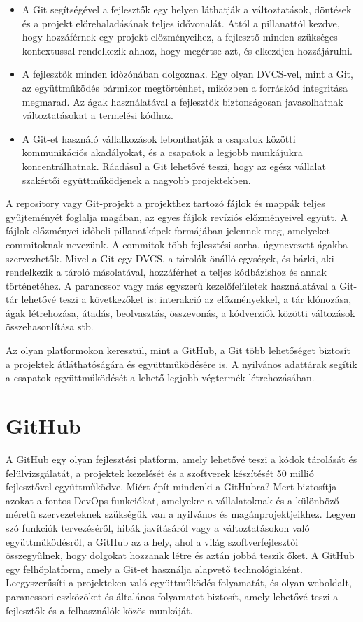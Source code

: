\begin{itemize}
  \item A Git segítségével a fejlesztők egy helyen láthatják a változtatások, döntések és a projekt előrehaladásának teljes idővonalát. Attól a pillanattól kezdve, hogy hozzáférnek egy projekt előzményeihez, a fejlesztő minden szükséges kontextussal rendelkezik ahhoz, hogy megértse azt, és elkezdjen hozzájárulni.
  \item A fejlesztők minden időzónában dolgoznak. Egy olyan DVCS-vel, mint a Git, az együttműködés bármikor megtörténhet, miközben a forráskód integritása megmarad. Az ágak használatával a fejlesztők biztonságosan javasolhatnak változtatásokat a termelési kódhoz.
  \item A Git-et használó vállalkozások lebonthatják a csapatok közötti kommunikációs akadályokat, és a csapatok a legjobb munkájukra koncentrálhatnak. Ráadásul a Git lehetővé teszi, hogy az egész vállalat szakértői együttműködjenek a nagyobb projektekben.
\end{itemize}

A repository vagy Git-projekt a projekthez tartozó fájlok és mappák teljes gyűjteményét foglalja magában, az egyes fájlok revíziós előzményeivel együtt. A fájlok előzményei időbeli pillanatképek formájában jelennek meg, amelyeket commitoknak nevezünk. A commitok több fejlesztési sorba, úgynevezett ágakba szervezhetők. Mivel a Git egy DVCS, a tárolók önálló egységek, és bárki, aki rendelkezik a tároló másolatával, hozzáférhet a teljes kódbázishoz és annak történetéhez. A parancssor vagy más egyszerű kezelőfelületek használatával a Git-tár lehetővé teszi a következőket is: interakció az előzményekkel, a tár klónozása, ágak létrehozása, átadás, beolvasztás, összevonás, a kódverziók közötti változások összehasonlítása stb.

Az olyan platformokon keresztül, mint a GitHub, a Git több lehetőséget biztosít a projektek átláthatóságára és együttműködésére is. A nyilvános adattárak segítik a csapatok együttműködését a lehető legjobb végtermék létrehozásában.
\cite{git}

\section{GitHub}
A GitHub egy olyan fejlesztési platform, amely lehetővé teszi a kódok tárolását és felülvizsgálatát, a projektek kezelését és a szoftverek készítését 50 millió fejlesztővel együttműködve. Miért épít mindenki a GitHubra? Mert biztosítja azokat a fontos DevOps funkciókat, amelyekre a vállalatoknak és a különböző méretű szervezeteknek szükségük van a nyilvános és magánprojektjeikhez. Legyen szó funkciók tervezéséről, hibák javításáról vagy a változtatásokon való együttműködésről, a GitHub az a hely, ahol a világ szoftverfejlesztői összegyűlnek, hogy dolgokat hozzanak létre és aztán jobbá teszik őket. A GitHub egy felhőplatform, amely a Git-et használja alapvető technológiaként. Leegyszerűsíti a projekteken való együttműködés folyamatát, és olyan weboldalt, parancssori eszközöket és általános folyamatot biztosít, amely lehetővé teszi a fejlesztők és a felhasználók közös munkáját.

